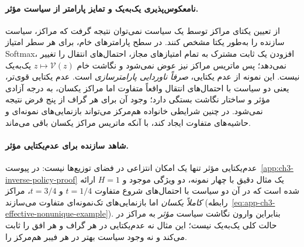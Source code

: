 \paragraph{نامعکوس‌پذیری یک‌به‌یک و تمایز پارامتر از سیاست مؤثر.}
از تعیین یکتای مراکز توسط
یک سیاست نمی‌توان نتیجه گرفت
که مراکز، سیاست سازنده را
به‌طور یکتا مشخص کنند.
در سطح پارامترهای خام،
برای هر سطر امتیاز Softmax،
افزودن یک ثابت مشترک به
تمام امتیازهای مجاز،
احتمال‌های انتقال را
تغییر نمی‌دهد؛ پس
ماتریس مراکز نیز عوض
نمی‌شود و نگاشت خام
$z\mapsto\mathcal V(z)$
یک‌به‌یک نیست.
این نمونه از عدم یکتایی،
\emph{صرفاً ناوردایی
پارامترسازی} است.
عدم یکتایی قوی‌تر،
یعنی دو سیاست با
احتمال‌های انتقال
واقعاً متفاوت اما
مراکز یکسان، به
درجه آزادی مؤثر و
ساختار نگاشت بستگی دارد؛
وجود آن برای هر گراف
از پنج فرض نتیجه نمی‌شود.
در چنین شرایطی
خانواده هم‌مرکز می‌تواند
بازنمایی‌های نمونه‌ای
و حاشیه‌های متفاوت
ایجاد کند، با آنکه
ماتریس مراکز یکسان
باقی می‌ماند.


\paragraph{شاهد سازنده برای عدم‌یکتایی مؤثر.}
عدم‌یکتایی مؤثر تنها یک امکان انتزاعی در فضای توزیع‌ها نیست:
در پیوست~\ref{app:ch3-inverse-policy-proof} یک مثال دقیق با
چهار نمونه، دو ویژگی موجود و $H=1$ ارائه شده است که در آن
دو سیاست  با احتمال‌های شروع متفاوت
$t=1/4$ و $t=3/4$، مراکز \emph{کاملاً یکسان}
اما بازنمایی‌های تک‌نمونه‌ای متفاوت می‌سازند
(رابطه~\eqref{eq:app-ch3-effective-nonunique-example}).
بنابراین وارون نگاشت سیاست \emph{مؤثر} به مراکز
در حالت کلی یک‌به‌یک نیست؛ این مثال نه عدم‌یکتایی
در هر گراف و هر افق را ثابت می‌کند و نه وجود سیاست بهتر
در هر فیبر هم‌مرکز را.

